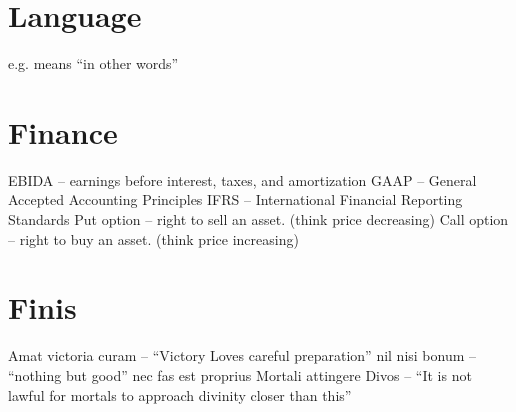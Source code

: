 \documentclass{article}
\begin{document}
\section{Language}
e.g. means ``in other words''
\newline
\newline

%
%
\newpage
\section{Finance}
EBIDA -- earnings before interest, taxes, and amortization
\newline
\newline
GAAP  -- General Accepted Accounting Principles
\newline
\newline
IFRS  -- International Financial Reporting Standards
\newline
\newline
Put option -- right to sell an asset. (think price decreasing)
\newline
\newline
Call option -- right to buy an asset. (think price increasing)

%
%
\newpage
\section{Finis}
Amat victoria curam -- ``Victory Loves careful preparation''
\newline
\newline
nil nisi bonum -- ``nothing but good''
\newline
\newline
nec fas est proprius Mortali attingere Divos -- ``It is not lawful for mortals to approach divinity closer than this''
\end{document}

